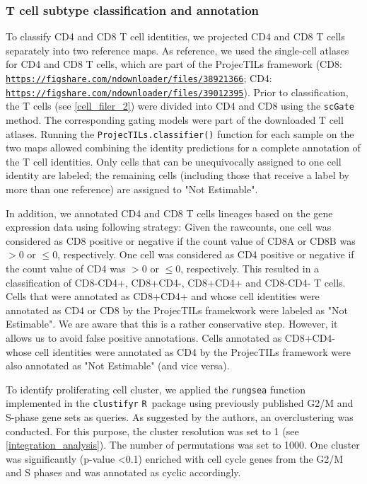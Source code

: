 \documentclass[10pt]{paper}
\renewcommand\_{\textunderscore\allowbreak}
\newcommand{\R}{\texttt{R}}
\begin{document}
\subsubsection{T cell subtype classification and annotation} \label{cell_filer_3}

To classify CD4 and CD8 T cell identities, we projected CD4 and CD8 T cells separately into two reference maps. As reference, we used the single-cell atlases for CD4 and CD8 T cells, which are part of the ProjecTILs \cite{Andreatta2021-fw} framework (CD8: \href{https://figshare.com/ndownloader/files/38921366}{\nolinkurl{https://figshare.com/ndownloader/files/38921366}}; CD4: \href{https://figshare.com/ndownloader/files/39012395}{\nolinkurl{https://figshare.com/ndownloader/files/39012395}}). Prior to classification, the T cells (see \ref{cell_filer_2}) were divided into CD4 and CD8 using the \texttt{scGate} method. The corresponding gating models were part of the downloaded T cell atlases. Running the \texttt{ProjecTILs.classifier()} function for each sample on the two maps allowed combining the identity predictions for a complete annotation of the T cell identities. Only cells that can be unequivocally assigned to one cell identity are labeled; the remaining cells (including those that receive a label by more than one reference) are assigned to "Not Estimable".

In addition, we annotated CD4 and CD8 T cells lineages based on the gene expression data using following strategy: Given the  rawcounts, one cell was considered as CD8 positive or negative if the  count value of CD8A or CD8B was $>$0 or $\leq$0, respectively. One cell was considered as CD4 positive or negative if the  count value of CD4 was $>$0 or $\leq$0, respectively. This resulted in a classification of CD8-CD4+, CD8+CD4-, CD8+CD4+ and CD8-CD4- T cells. Cells that were annotated as CD8+CD4+ and whose cell identities were annotated as CD4 or CD8 by the ProjecTILs framekwork were labeled as "Not Estimable". We are aware that this is a rather conservative step. However, it allows us to avoid false positive annotations. Cells annotated as CD8+CD4- whose cell identities were annotated as CD4 by the ProjecTILs framework were also annotated as "Not Estimable" (and vice versa).

To identify proliferating cell cluster, we applied the \texttt{run\_gsea} function implemented in the \texttt{clustifyr} \R\ package \cite{Fu2020-fp} using previously published  G2/M and S-phase gene sets \cite{Tirosh2016-ct} as queries. As suggested by the authors, an overclustering was conducted. For this purpose, the cluster resolution was set to 1 (see \ref{integration_analysis}). The number of permutations was set to 1000. One cluster was significantly (p-value <0.1) enriched with cell cycle genes from the G2/M and S phases and was annotated as cyclic accordingly.
\end{document}
